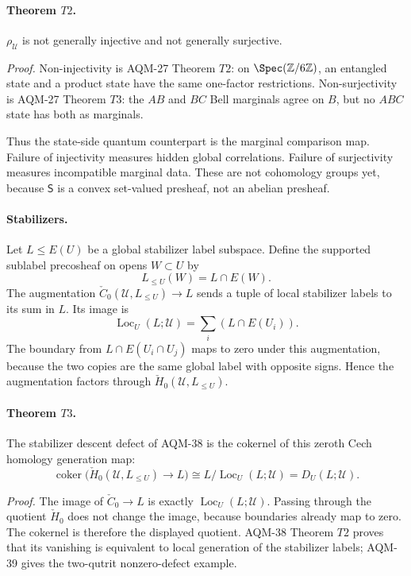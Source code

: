 \paragraph{Theorem \(T2\).}
\(\rho_{\mathcal U}\) is not generally injective and not generally
surjective.

\emph{Proof.}
Non-injectivity is AQM-27 Theorem \(T2\): on
\(\Spec(\mathbb Z/6\mathbb Z)\), an entangled state and a product state have
the same one-factor restrictions.  Non-surjectivity is AQM-27 Theorem \(T3\):
the \(AB\) and \(BC\) Bell marginals agree on \(B\), but no \(ABC\) state has
both as marginals.

Thus the state-side quantum counterpart is the marginal comparison map.
Failure of injectivity measures hidden global correlations.  Failure of
surjectivity measures incompatible marginal data.  These are not cohomology
groups yet, because \(\mathsf S\) is a convex set-valued presheaf, not an
abelian presheaf.

\paragraph{Stabilizers.}
Let \(L\leq E(U)\) be a global stabilizer label subspace.  Define the
supported sublabel precosheaf on opens \(W\subset U\) by
\[
  L_{\leq U}(W)=L\cap E(W).
\]
The augmentation \(\check C_0(\mathcal U,L_{\leq U})\to L\) sends a tuple of
local stabilizer labels to its sum in \(L\).  Its image is
\[
  \operatorname{Loc}_U(L;\mathcal U)
  =
  \sum_i(L\cap E(U_i)).
\]
The boundary from \(L\cap E(U_i\cap U_j)\) maps to zero under this
augmentation, because the two copies are the same global label with opposite
signs.  Hence the augmentation factors through
\(\check H_0(\mathcal U,L_{\leq U})\).

\paragraph{Theorem \(T3\).}
The stabilizer descent defect of AQM-38 is the cokernel of this zeroth Cech
homology generation map:
\[
  \operatorname{coker}\bigl(
  \check H_0(\mathcal U,L_{\leq U})\to L
  \bigr)
  \cong
  L/\operatorname{Loc}_U(L;\mathcal U)
  =
  D_U(L;\mathcal U).
\]

\emph{Proof.}
The image of \(\check C_0\to L\) is exactly
\(\operatorname{Loc}_U(L;\mathcal U)\).  Passing through the quotient
\(\check H_0\) does not change the image, because boundaries already map to
zero.  The cokernel is therefore the displayed quotient.  AQM-38 Theorem
\(T2\) proves that its vanishing is equivalent to local generation of the
stabilizer labels; AQM-39 gives the two-qutrit nonzero-defect example.


